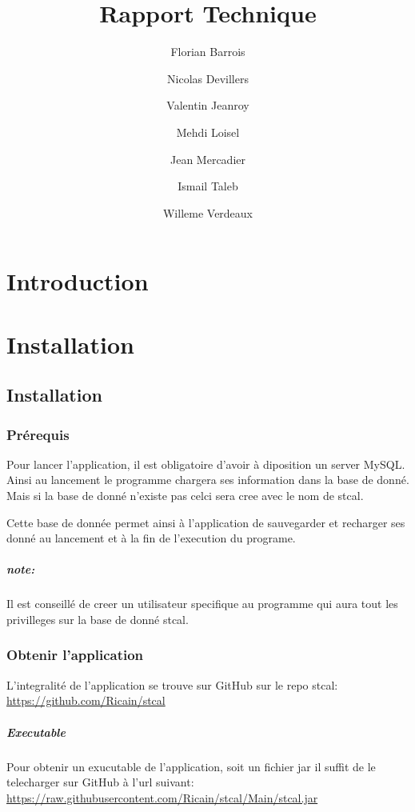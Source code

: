 \documentclass[a4paper,10pt]{report}
\title{Rapport Technique}
\author{Florian Barrois \and Nicolas Devillers \and Valentin Jeanroy \and Mehdi Loisel \and Jean Mercadier \and Ismail Taleb \and Willeme Verdeaux}
\begin{document}
\thispagestyle{headings}

\maketitle

\tableofcontents

\chapter*{Introduction}

\chapter{Installation}

\section{Installation}

\subsection{Prérequis}

	Pour lancer l'application, il est obligatoire d'avoir à diposition un server MySQL. Ainsi au lancement le programme chargera ses information dans la base de donné. Mais si la base de donné n'existe pas celci sera cree avec le nom de stcal.

	Cette base de donnée permet ainsi à l'application de sauvegarder et recharger ses donné au lancement et à la fin de l'execution du programe.

\paragraph*{note:}
	Il est conseillé de creer un utilisateur specifique au programme qui aura tout les privilleges sur la base de donné stcal.

\subsection{Obtenir l'application}

	L'integralité de l'application se trouve sur GitHub sur le repo stcal: \href{https://github.com/Ricain/stcal}{https://github.com/Ricain/stcal}
	
	\paragraph[Binaire]{Executable}
	Pour obtenir un exucutable de l'application, soit un fichier jar il suffit de le telecharger sur GitHub à l'url suivant: \href{https://raw.githubusercontent.com/Ricain/stcal/Main/stcal.jar}{https://raw.githubusercontent.com/Ricain/stcal/Main/stcal.jar}
\end{document}

